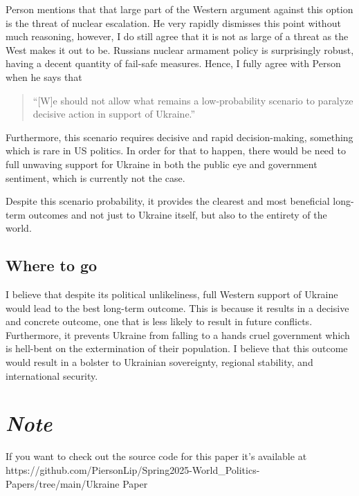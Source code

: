 \documentclass{article}
\begin{document}
        Person mentions that that large part of the Western argument against this option is the threat of nuclear escalation. He very rapidly dismisses this point without much reasoning, however, I do still agree that it is not as large of a threat as the West makes it out to be. Russians nuclear armament policy is surprisingly robust, having a decent quantity of fail-safe measures. Hence, I fully agree with Person when he says that 

        \begin{quote}
            ``[W]e should not allow what remains a low-probability scenario to paralyze decisive action in support of Ukraine.'' \parencite{person_2025}
        \end{quote}
        
        Furthermore, this scenario requires decisive and rapid decision-making, something which is rare in US politics. In order for that to happen, there would be need to full unwaving support for Ukraine in both the public eye and government sentiment, which is currently not the case. 

        Despite this scenario probability, it provides the clearest and most beneficial long-term outcomes and not just to Ukraine itself, but also to the entirety of the world. 
        
    \subsection{Where to go}
        I believe that despite its political unlikeliness, full Western support of Ukraine would lead to the best long-term outcome. This is because it results in a decisive and concrete outcome, one that is less likely to result in future conflicts. Furthermore, it prevents Ukraine from falling to a hands cruel government which is hell-bent on the extermination of their population. I believe that this outcome would result in a bolster to Ukrainian sovereignty, regional stability, and international security.

\section{\textit{Note}}
    If you want to check out the source code for this paper it's available at https://github.com/PiersonLip/Spring2025-World\_Politics-Papers/tree/main/Ukraine Paper\
\end{document}

